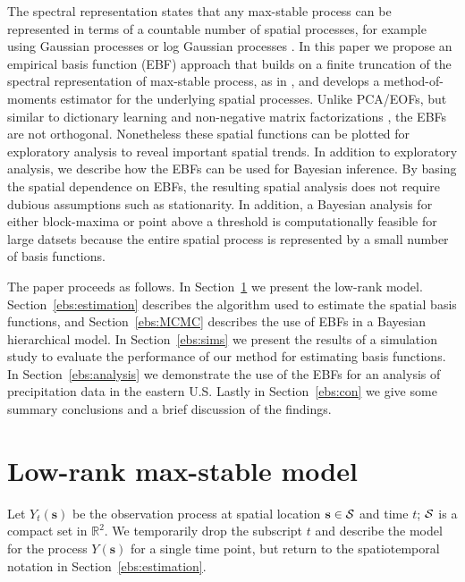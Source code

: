 \documentclass[12pt]{article}
\newcommand{\bs}{\ensuremath{\mathbf{s}}}
\newcommand{\calS}{{\cal S}}
\newcommand{\sref}[1]{Section~\ref{#1}}
\begin{document}
The spectral representation \citep[\S9.6]{deHaan2006} states that any max-stable process can be represented in terms of a countable number of spatial processes, for example using Gaussian processes \citep{Schlather2002} or log Gaussian processes \citep{Kabluchko2009}.
In this paper we propose an empirical basis function (EBF) approach that builds on a finite truncation of the spectral representation of max-stable process, as in \citet{Wang2011}, and develops a method-of-moments estimator for the underlying spatial processes.
Unlike PCA/EOFs, but similar to dictionary learning \citep{Mairal2014} and non-negative matrix factorizations \citep{Lee1999}, the EBFs are not orthogonal.
Nonetheless these spatial functions can be plotted for exploratory analysis to reveal important spatial trends. 
In addition to exploratory analysis, we describe how the EBFs can be used for Bayesian inference. 
By basing the spatial dependence on EBFs, the resulting spatial analysis does not require dubious assumptions such as stationarity.
In addition, a Bayesian analysis for either block-maxima or point above a threshold is computationally feasible for large datsets because the entire spatial process is represented by a small number of basis functions.

The paper proceeds as follows. In \sref{ebs:model} we present the low-rank model. \sref{ebs:estimation} describes the algorithm used to estimate the spatial basis functions, and \sref{ebs:MCMC} describes the use of EBFs in a Bayesian hierarchical model. 
In \sref{ebs:sims} we present the results of a simulation study to evaluate the performance of our method for estimating basis functions. 
In \sref{ebs:analysis} we demonstrate the use of the EBFs for an analysis of precipitation data in the eastern U.S. Lastly in \sref{ebs:con} we give some summary conclusions and a brief discussion of the findings.

\section{Low-rank max-stable model}\label{ebs:model} Let $Y_{t}(\bs)$ be the observation process at spatial location $\bs\in\calS$ and time $t$; $\calS$ is a compact set in $\mathbb{R}^2$.  We temporarily drop the subscript $t$ and describe the model for the process $Y(\bs)$ for a single time point, but return to the spatiotemporal notation in \sref{ebs:estimation}.
\end{document}
